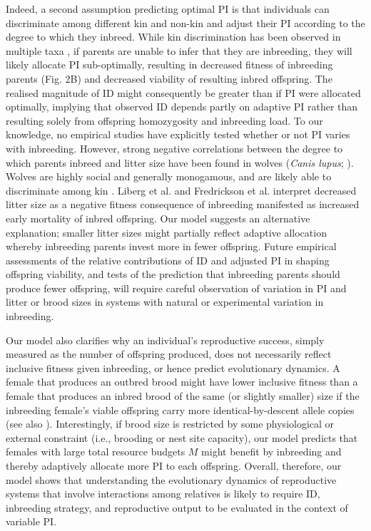 \documentclass[12pt]{article}
\begin{document}
Indeed, a second assumption predicting optimal PI is that individuals can discriminate among different kin and non-kin and adjust their PI according to the degree to which they inbreed. {\color{blue}While kin discrimination has been observed in multiple taxa \cite[e.g.,][]{Mateo2002, Griffin2003, Dudley2007, Strassmann2011},} if parents are unable to infer that they are inbreeding, they will likely allocate PI sub-optimally, resulting in decreased fitness of inbreeding parents (Fig. 2B) and decreased viability of resulting inbred offspring. The realised magnitude of ID might consequently be greater than if PI were allocated optimally, implying that observed ID depends partly on adaptive PI rather than resulting solely from offspring homozygosity and inbreeding load. To our knowledge, no empirical studies have explicitly tested whether or not PI varies with inbreeding. However, strong negative correlations between the degree to which parents inbreed and litter size have been found in wolves (\textit{Canis lupus}; \cite{Liberg2005, Fredrickson2007}). Wolves are highly social and generally monogamous, and are likely able to discriminate among kin \cite[][]{Raikkonen2009, Geffen2011}. Liberg et al. \cite{Liberg2005} and Fredrickson et al. \cite{Fredrickson2007} interpret decreased litter size as a negative fitness consequence of inbreeding manifested as increased early mortality of inbred offspring. Our model suggests an alternative explanation; smaller litter sizes might partially reflect adaptive allocation whereby inbreeding parents invest more in fewer offspring. Future empirical assessments of the relative contributions of ID and adjusted PI in shaping offspring viability, and tests of the prediction that inbreeding parents should produce fewer offspring, will require careful observation of variation in PI and litter or brood sizes in systems with natural or experimental variation in inbreeding.

Our model also clarifies why an individual's reproductive success, simply measured as the number of offspring produced, does not necessarily reflect inclusive fitness given inbreeding, or hence predict evolutionary dynamics. A female that produces an outbred brood might have lower inclusive fitness than a female that produces an inbred brood of the same (or slightly smaller) size if the inbreeding female's viable offspring carry more identical-by-descent allele copies (see also \cite{Reid2016}). Interestingly, if brood size is restricted by some physiological or external constraint (i.e., brooding or nest site capacity), our model predicts that females with large total resource budgets $M$ might benefit by inbreeding and thereby adaptively allocate more PI to each offspring. Overall, therefore, our model shows that understanding the evolutionary dynamics of reproductive systems that involve interactions among relatives is likely to require ID, inbreeding strategy, and reproductive output to be evaluated in the context of variable PI.
\end{document}
